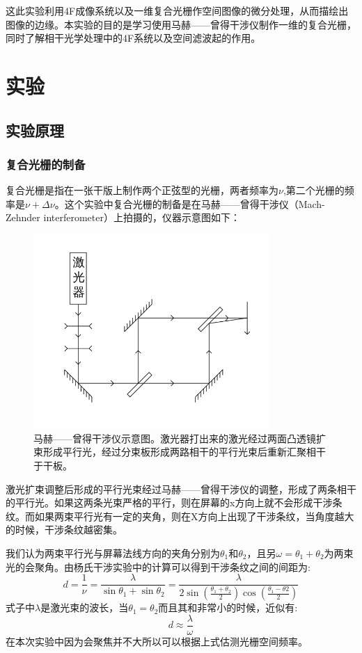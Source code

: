 \documentclass[aps,pre,12pt,preprint,onecolumn,showpacs,showkeys,UTF8]{revtex4-1}
\begin{document}
这此实验利用4F成像系统以及一维复合光栅作空间图像的微分处理，从而描绘出图像的边缘。本实验的目的是学习使用马赫——曾得干涉仪制作一维的复合光栅，同时了解相干光学处理中的4F系统以及空间滤波起的作用。

\section{实验}
\subsection{实验原理}
\subsubsection{复合光栅的制备}
复合光栅是指在一张干版上制作两个正弦型的光栅，两者频率为$\nu$,第二个光栅的频率是$\nu+\Delta \nu$。这个实验中复合光栅的制备是在马赫——曾得干涉仪（Mach-Zehnder interferometer）上拍摄的，仪器示意图如下：

\begin{figure}[h]
	\begin{center}
		\includegraphics[width=0.8\textwidth]{pic1.png}
		\caption{\label{fig:exp1}马赫——曾得干涉仪示意图。激光器打出来的激光经过两面凸透镜扩束形成平行光，经过分束板形成两路相干的平行光束后重新汇聚相干于干板。}
	\end{center}
\end{figure}

激光扩束调整后形成的平行光束经过马赫——曾得干涉仪的调整，形成了两条相干的平行光。如果这两条光束严格的平行，则在屏幕的x方向上就不会形成干涉条纹。而如果两束平行光有一定的夹角，则在X方向上出现了干涉条纹，当角度越大的时候，干涉条纹越密集。

我们认为两束平行光与屏幕法线方向的夹角分别为$\theta_1$和$\theta_2$，且另$\omega=\theta_1+\theta_2$为两束光的会聚角。由杨氏干涉实验中的计算可以得到干涉条纹之间的间距为:
\begin{equation}
	d=\frac{1}{\nu}=\frac{\lambda}{\sin \theta_1+\sin \theta_2}=\frac{\lambda}{2\sin{(\frac{\theta_1+\theta_2}{2})}\cos{(\frac{\theta_1-\theta2}{2})}}
\end{equation}
式子中$\lambda$是激光束的波长，当$\theta_1=\theta_2$而且其和非常小的时候，近似有:\begin{equation}
	d\approx\frac{\lambda}{\omega}
\end{equation}
在本次实验中因为会聚焦并不大所以可以根据上式估测光栅空间频率。
\end{document}
